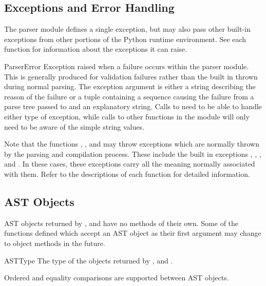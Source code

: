\subsection{Exceptions and Error Handling}
\label{AST Errors}

The parser module defines a single exception, but may also pass other
built-in exceptions from other portions of the Python runtime
environment.  See each function for information about the exceptions
it can raise.

\begin{excdesc}{ParserError}
Exception raised when a failure occurs within the parser module.  This
is generally produced for validation failures rather than the built in
 thrown during normal parsing.
The exception argument is either a string describing the reason of the
failure or a tuple containing a sequence causing the failure from a parse
tree passed to  and an explanatory string.  Calls to
 need to be able to handle either type of exception,
while calls to other functions in the module will only need to be
aware of the simple string values.
\end{excdesc}

Note that the functions , , and
 may throw exceptions which are normally thrown by the
parsing and compilation process.  These include the built in
exceptions , ,
, and .  In these cases, these
exceptions carry all the meaning normally associated with them.  Refer
to the descriptions of each function for detailed information.


\subsection{AST Objects}
\label{AST Objects}

AST objects returned by ,  and
 have no methods of their own.
Some of the functions defined which accept an AST object as their
first argument may change to object methods in the future.

\begin{datadesc}{ASTType}
The type of the objects returned by ,
 and .

Ordered and equality comparisons are supported between AST objects.
\end{datadesc}


